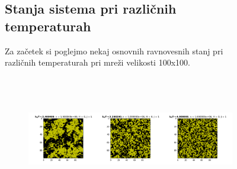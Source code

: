 \documentclass[11pt, a4paper]{article}
\begin{document}
\begin{figure}[H]
\subsection{Stanja sistema pri različnih temperaturah}
Za začetek si poglejmo nekaj osnovnih ravnovesnih stanj pri različnih temperaturah pri mreži  velikosti 100x100.
 \begin{figure}[H]
\centering
  \includegraphics[width=17.5cm, height=5.5cm]{druga_domene2.png}


\end{figure}
\end{figure}
\end{document}
